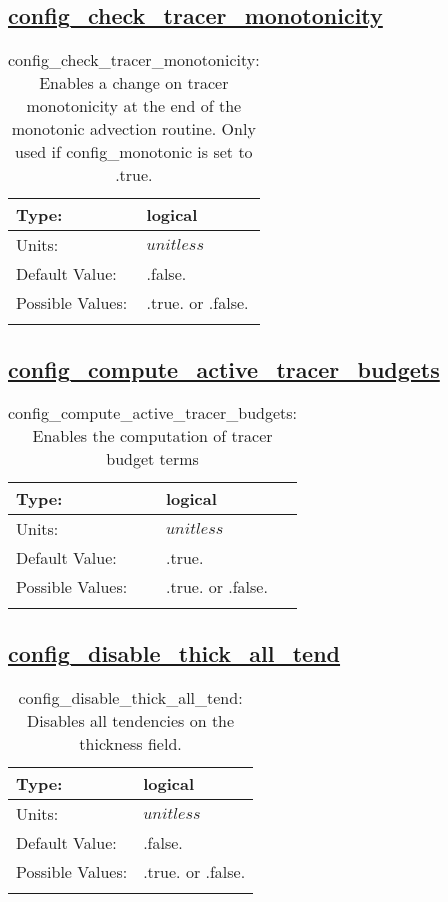 \subsection[config\_check\_tracer\_monotonicity]{\hyperref[sec:nm_tab_debug]{config\_check\_tracer\_monotonicity}}
\label{subsec:nm_sec_config_check_tracer_monotonicity}
\begin{center}
\begin{longtable}{| p{2.0in} || p{4.0in} |}
    \hline
    Type: & logical \\
    \hline
    Units: & $unitless$ \\
    \hline
    Default Value: & .false. \\
    \hline
    Possible Values: & .true. or .false. \\
    \hline
    \caption{config\_check\_tracer\_monotonicity: Enables a change on tracer monotonicity at the end of the monotonic advection routine. Only used if config\_monotonic is set to .true.}
\end{longtable}
\end{center}
\subsection[config\_compute\_active\_tracer\_budgets]{\hyperref[sec:nm_tab_debug]{config\_compute\_active\_tracer\_budgets}}
\label{subsec:nm_sec_config_compute_active_tracer_budgets}
\begin{center}
\begin{longtable}{| p{2.0in} || p{4.0in} |}
    \hline
    Type: & logical \\
    \hline
    Units: & $unitless$ \\
    \hline
    Default Value: & .true. \\
    \hline
    Possible Values: & .true. or .false. \\
    \hline
    \caption{config\_compute\_active\_tracer\_budgets: Enables the computation of tracer budget terms}
\end{longtable}
\end{center}
\subsection[config\_disable\_thick\_all\_tend]{\hyperref[sec:nm_tab_debug]{config\_disable\_thick\_all\_tend}}
\label{subsec:nm_sec_config_disable_thick_all_tend}
\begin{center}
\begin{longtable}{| p{2.0in} || p{4.0in} |}
    \hline
    Type: & logical \\
    \hline
    Units: & $unitless$ \\
    \hline
    Default Value: & .false. \\
    \hline
    Possible Values: & .true. or .false. \\
    \hline
    \caption{config\_disable\_thick\_all\_tend: Disables all tendencies on the thickness field.}
\end{longtable}
\end{center}
